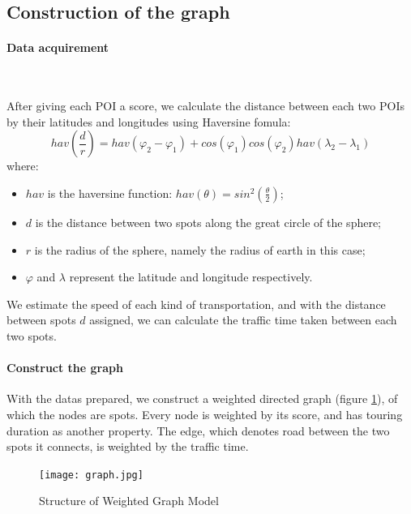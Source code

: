 \documentclass{mcmthesis}
\begin{document}
\subsection{Construction of the graph}
  \paragraph{Data acquirement} \

  After giving each POI a score, we calculate the distance between each two POIs by their latitudes and longitudes using Haversine fomula:
  \[
    hav(\frac{d}{r}) = hav(\varphi_{2}-\varphi_{1}) + cos(\varphi_{1})cos(\varphi_{2})hav(\lambda_{2}-\lambda_{1})
  \]
  where:
  \begin{itemize}
    \item $hav$ is the haversine function: $hav(\theta) = sin^{2}(\frac{\theta}{2})$;
    \item $d$ is the distance between two spots along the great circle of the sphere;
    \item $r$ is the radius of the sphere, namely the radius of earth in this case;
    \item $\varphi$ and $\lambda$ represent the latitude and longitude respectively.
  \end{itemize} 
  We estimate the speed of each kind of transportation, and with the distance between spots $d$ assigned, we can calculate the traffic time taken between each two spots. \par
  \paragraph{Construct the graph} 

  With the datas prepared, we construct a weighted directed graph (figure \ref{fig:graph}), of which the nodes are spots. Every node is weighted by its score, and has touring duration as another property. The edge, which denotes road between the two spots it connects, is weighted by the traffic time.
  \begin{figure}[ht]
    \centering
    \texttt{[image: graph.jpg]}
    \caption{Structure of Weighted Graph Model}
    \label{fig:graph}
  \end{figure}

\end{document}
